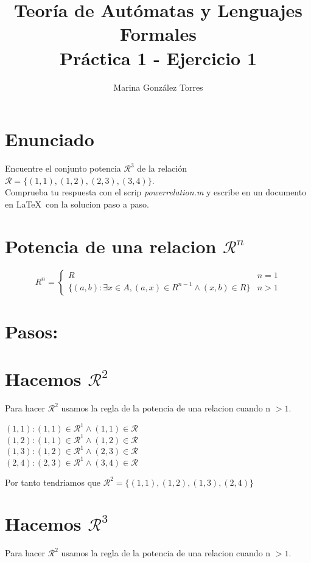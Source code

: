 \documentclass{article}
\title{Teoría de Autómatas y Lenguajes Formales\\[.4\baselineskip]Práctica 1 - Ejercicio 1}
\author{Marina González Torres}
\date{}
\begin{document}
\maketitle
\setlength{\parindent}{0pt}

\section*{Enunciado}
Encuentre el conjunto potencia $\mathcal R^{3}$ de la relación $\mathcal R = \{(1,1), (1,2), (2,3), (3,4)\}$.
\\Comprueba tu respuesta con el scrip \textit{powerrelation.m} y escribe en un documento en \LaTeX \ con la solucion paso a paso.

\section*{Potencia de una relacion $\mathcal R^{n}$}

\begin{equation*}
    R^{n} =
    \begin{cases}
        R & n = 1 
        \\ \{(a,b) : \exists x \in A, (a,x) \in R^{n-1} \wedge (x,b) \in R\} & n > 1
    \end{cases}
\end{equation*}

\section*{Pasos:}
\section{Hacemos $\mathcal R^{2}$}
Para hacer $\mathcal R^{2}$ usamos la regla de la potencia de una relacion cuando n $\mathcal > 1$.

\begin{center}
    $(1,1) : (1,1) \in \mathcal R^{1} \wedge (1,1) \in \mathcal R$
    \\$(1,2) : (1,1) \in \mathcal R^{1} \wedge (1,2) \in \mathcal R$
    \\$(1,3) : (1,2) \in \mathcal R^{1} \wedge (2,3) \in \mathcal R$
    \\$(2,4) : (2,3) \in \mathcal R^{1} \wedge (3,4) \in \mathcal R$
\end{center}
Por tanto tendriamos que $\mathcal R^{2} = \{(1,1), (1,2), (1,3), (2,4)\}$

\section{Hacemos $\mathcal R^{3}$}
Para hacer $\mathcal R^{2}$ usamos la regla de la potencia de una relacion cuando n $\mathcal > 1$.
\end{document}
